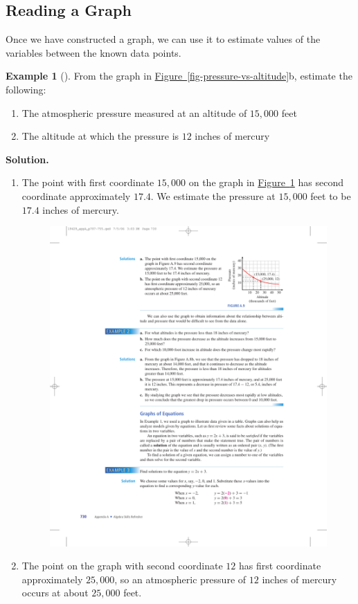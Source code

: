 \documentclass[10pt,]{book}
\theoremstyle{plain}
\theoremstyle{definition}
\theoremstyle{definition}
\newtheorem{example}[theorem]{Example}
\theoremstyle{definition}
\numberwithin{equation}{part}
\begin{document}
\subsection[{Reading a Graph}]{Reading a Graph}\label{subsection-17}
Once we have constructed a graph, we can use it to estimate values of the variables between the known data points.%
\begin{example}[]\label{example-pressure-vs-altitude}
From the graph in \hyperref[fig-pressure-vs-altitude]{Figure~\ref{fig-pressure-vs-altitude}}b, estimate the following: \leavevmode%
\begin{enumerate}[label=*\alph**]
\item\hypertarget{li-159}{}The atmospheric pressure measured at an altitude of \(15,000\) feet%
\item\hypertarget{li-160}{}The altitude at which the pressure is \(12\) inches of mercury%
\end{enumerate}
%
\par\medskip\noindent%
\textbf{Solution.}\quad \leavevmode%
\begin{enumerate}[label=*\alph**]
\item\hypertarget{li-161}{}The point with first coordinate \(15,000\) on the graph in \hyperref[fig-pressure-vs-altitude2]{Figure~\ref{fig-pressure-vs-altitude2}} has second coordinate approximately \(17.4\). We estimate the pressure at \(15,000\) feet to be \(17.4\) inches of mercury. \leavevmode%
\begin{figure}
\centering
\includegraphics[width=0.6\linewidth]{images/fig-pressure-vs-altitude2}
\caption{\label{fig-pressure-vs-altitude2}}
\end{figure}
%
\item\hypertarget{li-162}{}The point on the graph with second coordinate \(12\) has first coordinate approximately \(25,000\), so an atmospheric pressure of \(12\) inches of mercury occurs at about \(25,000\) feet.%
\end{enumerate}
%
\end{example}
\end{document}
